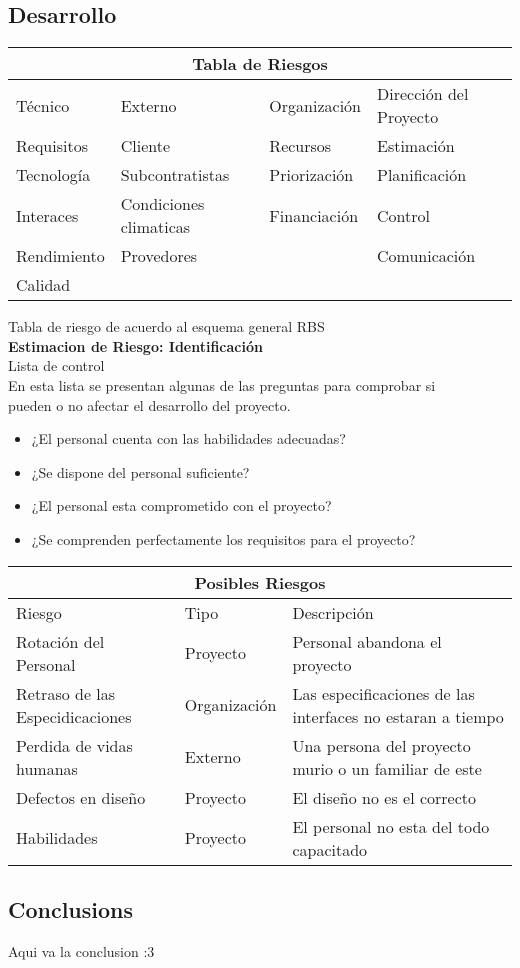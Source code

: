 \documentclass[12pt]{article}
\begin{document}
\subsection{Desarrollo}\label{desarrollo}

\setlength{\arrayrulewidth}{1mm}
\setlength{\tabcolsep}{10pt}
\renewcommand{\arraystretch}{1.5}

\begin{tabular}{ |p{2.5cm}||p{3cm}|p{2.5cm}|p{3cm}|  }
\hline
\multicolumn{4}{|c|}{Tabla de Riesgos} \\
\hline
Técnico & Externo & Organización&Dirección del Proyecto\\
\hline
Requisitos   & Cliente    &Recursos&   Estimación\\
Tecnología &   Subcontratistas  & Priorización   &Planificación\\
Interaces &Condiciones climaticas & Financiación &  Control\\
Rendimiento    & Provedores &   &  Comunicación\\
Calidad &   &   &   \\
\hline
\end{tabular}
Tabla de riesgo de acuerdo al esquema general RBS\\

\textbf{Estimacion de Riesgo: Identificación}\\
Lista de control\\
En esta lista se presentan algunas de las preguntas para comprobar si\\
pueden o no afectar el desarrollo del proyecto.\\
\begin{itemize}
\item ¿El personal cuenta con las habilidades adecuadas?
\item ¿Se dispone del personal suficiente?
\item ¿El personal esta comprometido con el proyecto?
\item ¿Se comprenden perfectamente los requisitos para el proyecto?
\end{itemize}

\begin{tabular}{ |p{4cm}||p{2.5cm}|p{6cm}|  }
 \hline
 \multicolumn{3}{|c|}{Posibles Riesgos} \\
 \hline
 Riesgo& Tipo & Descripción\\
 \hline
 Rotación del Personal& Proyecto&Personal abandona el proyecto\\
 Retraso de las Especidicaciones& Organización  & Las especificaciones de las interfaces no estaran a tiempo\\
 Perdida de vidas humanas &Externo & Una persona del proyecto murio o un familiar de este\\
 Defectos en diseño &Proyecto & El diseño no es el correcto\\
 Habilidades & Proyecto & El personal no esta del todo capacitado\\
 
 \hline
\end{tabular}

\subsection{Conclusions}\label{conclusions}
Aqui va la conclusion :3



\end{document}

